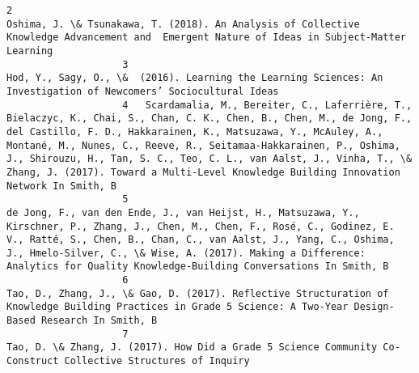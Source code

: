 \documentclass[journal,twocolumn]{IEEEtran}
\begin{document}
\begin{Verbatim}[commandchars=\\\{\}]
                    2                                                                                                                                                                                                                                                                                   Oshima, J. \& Tsunakawa, T. (2018). An Analysis of Collective Knowledge Advancement and  Emergent Nature of Ideas in Subject-Matter Learning
                    3                                                                                                                                                                                                                                                                                                             Hod, Y., Sagy, O., \&  (2016). Learning the Learning Sciences: An Investigation of Newcomers’ Sociocultural Ideas 
                    4   Scardamalia, M., Bereiter, C., Laferrière, T., Bielaczyc, K., Chai, S., Chan, C. K., Chen, B., Chen, M., de Jong, F., del Castillo, F. D., Hakkarainen, K., Matsuzawa, Y., McAuley, A., Montané, M., Nunes, C., Reeve, R., Seitamaa-Hakkarainen, P., Oshima, J., Shirouzu, H., Tan, S. C., Teo, C. L., van Aalst, J., Vinha, T., \& Zhang, J. (2017). Toward a Multi-Level Knowledge Building Innovation Network In Smith, B
                    5                                                                                        de Jong, F., van den Ende, J., van Heijst, H., Matsuzawa, Y., Kirschner, P., Zhang, J., Chen, M., Chen, F., Rosé, C., Godinez, E. V., Ratté, S., Chen, B., Chan, C., van Aalst, J., Yang, C., Oshima, J., Hmelo-Silver, C., \& Wise, A. (2017). Making a Difference: Analytics for Quality Knowledge-Building Conversations In Smith, B
                    6                                                                                                                                                                                                                                                               Tao, D., Zhang, J., \& Gao, D. (2017). Reflective Structuration of Knowledge Building Practices in Grade 5 Science: A Two-Year Design-Based Research In Smith, B
                    7                                                                                                                                                                                                                                                                                                                 Tao, D. \& Zhang, J. (2017). How Did a Grade 5 Science Community Co-Construct Collective Structures of Inquiry

\end{Verbatim}
\end{document}

